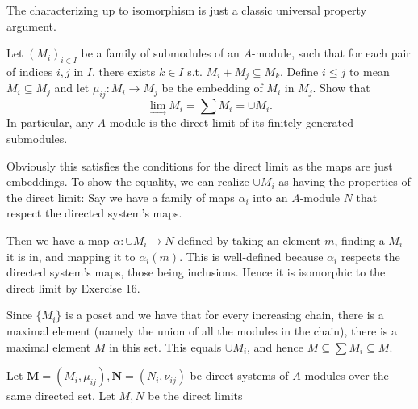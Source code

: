 \documentclass[a4paper]{exam}
\begin{document}
\begin{questions}
\begin{solution}
		The characterizing up to isomorphism is just a classic universal property argument.
	\end{solution}

	\question Let $(M_i)_{i\in I} $ be a family of submodules of an $A $-module, such that for each pair of indices $i,j $ in $I $, there exists $k\in I $ s.t. $M_i + M_j \subseteq M_k $. Define $i\le j $ to mean $M_i \subseteq M_j $ and let $\mu _{ij}: M_i\to M_j $ be the embedding of $M_i $ in $M_j $. Show that
	\[
		\lim_{\rightarrow} M_i = \sum M_i = \cup M_i
	.\]
	In particular, any $A $-module is the direct limit of its finitely generated submodules.
	\begin{solution}
		Obviously this satisfies the conditions for the direct limit as the maps are just embeddings.
		To show the equality, we can realize $\cup M_i $ as having the properties of the direct limit:
		Say we have a family of maps $\alpha _i $ into an $A $-module $N $ that respect the directed system's maps.

		Then we have a map $\alpha :\cup M_i \to N$ defined by taking an element $m $, finding a $ M_i$ it is in, and mapping it to $\alpha _i(m) $.
		This is well-defined because $\alpha _i $ respects the directed system's maps, those being inclusions.
		Hence it is isomorphic to the direct limit by Exercise 16.

		Since $\{M_i\}   $ is a poset and we have that for every increasing chain, there is a maximal element (namely the union of all the modules in the chain), there is a maximal element $M $ in this set.
		This equals $\cup M_i $, and hence $M \subseteq \sum M_i \subseteq M $.
	\end{solution}

	\question Let $\bm{M} = (M_i, \mu_{ij}), \bm{N}=(N_i,\nu_{ij}) $ be direct systems of $A $-modules over the same directed set. Let $M,N $ be the direct limits
\end{questions}
\end{document}
